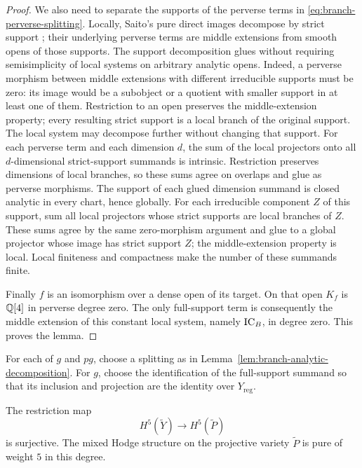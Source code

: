 \begin{proof}
We also need to separate the supports of the perverse terms in
\eqref{eq:branch-perverse-splitting}.  Locally, Saito's pure
direct images decompose by strict support
\cite[Section~5.1 and Theorem~5.3.1]{SaitoMHP}; their underlying
perverse terms are middle extensions from smooth opens of those
supports.  The support decomposition glues without requiring
semisimplicity of local systems on arbitrary analytic opens.  Indeed,
a perverse morphism between middle extensions with different
irreducible supports must be zero: its image would be a subobject or
a quotient with smaller support in at least one of them.  Restriction
to an open preserves the middle-extension property; every resulting
strict support is a local branch of the original support.  The local
system may decompose further without changing that support.  For each
perverse term and each dimension $d$, the sum of the local projectors
onto all $d$-dimensional strict-support summands is intrinsic.
Restriction preserves dimensions of local branches, so these sums
agree on overlaps and glue as perverse morphisms.  The support of each
glued dimension summand is closed analytic in every chart, hence
globally.  For each irreducible component $Z$ of this support, sum all
local projectors whose strict supports are local branches of $Z$.
These sums agree by the same zero-morphism argument and glue to a
global projector whose image has strict support $Z$; the
middle-extension property is local.  Local finiteness and compactness
make the number of these summands finite.

Finally $f$ is an isomorphism over a dense open of its target.  On
that open $K_f$ is $\mathbb{Q}[4]$ in perverse degree zero.  The only
full-support term is consequently the middle extension of this
constant local system, namely $\operatorname{IC}_B$, in degree zero.  This proves
the lemma.
\end{proof}

For each of $g$ and $pg$, choose a splitting as in
Lemma~\ref{lem:branch-analytic-decomposition}.  For $g$, choose the
identification of the full-support summand so that its inclusion and
projection are the identity over $Y_{\mathrm{reg}}$.

\begin{lemma}
\label{lem:branch-resolved-purity}
The restriction map
\[
 H^5(\widetilde Y)\longrightarrow H^5(\widetilde P)
\]
is surjective.  The mixed Hodge structure on the projective variety
$\widetilde P$ is pure of weight $5$ in this degree.
\end{lemma}

